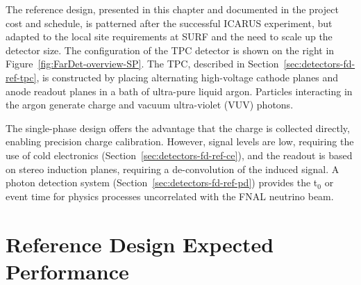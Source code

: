 The reference design, presented in this chapter and documented in the
project cost and schedule, is patterned after the successful ICARUS
experiment, but adapted to the local site requirements at SURF and the
need to scale up the detector size. The configuration of the TPC
detector is shown on the right in Figure~\ref{fig:FarDet-overview-SP}.
The TPC, described in Section~\ref{sec:detectors-fd-ref-tpc}, is
constructed by placing alternating high-voltage cathode planes and
anode readout planes in a bath of ultra-pure liquid argon. Particles
interacting in the argon generate charge and vacuum ultra-violet (VUV)
photons.


The single-phase design offers the advantage that the charge is
collected directly, enabling precision charge calibration. However,
signal levels are low, requiring the use of cold electronics
(Section~\ref{sec:detectors-fd-ref-ce}), and the readout is based on
stereo induction planes, requiring a de-convolution of the induced
signal. A photon detection system
(Section~\ref{sec:detectors-fd-ref-pd}) provides the t$_0$ or event
time for physics processes uncorrelated with the FNAL neutrino beam.

\section{Reference Design Expected Performance}
\label{sec:detectors-fd-ref-perf}


